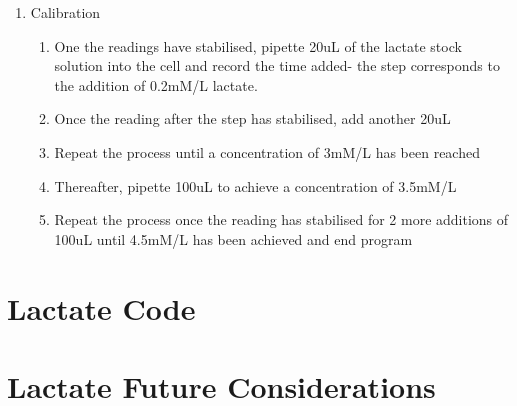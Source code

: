 \begin{appendices}
\begin{enumerate}
    \item Calibration
        \begin{enumerate}
            \item One the readings have stabilised, pipette 20uL of the lactate stock solution into the cell and record the time added- the step corresponds to the addition of 0.2mM/L lactate.
            \item Once the reading after the step has stabilised, add another 20uL
            \item Repeat the process until a concentration of 3mM/L has been reached
            \item Thereafter, pipette 100uL to achieve a concentration of 3.5mM/L
            \item Repeat the process once the reading has stabilised for 2 more additions of 100uL until 4.5mM/L has been achieved and end program
        \end{enumerate}
\end{enumerate}

\newpage
\section{Lactate Code}

\newpage
\section{Lactate Future Considerations}
\label{app:Lactate_future}

\end{appendices}
